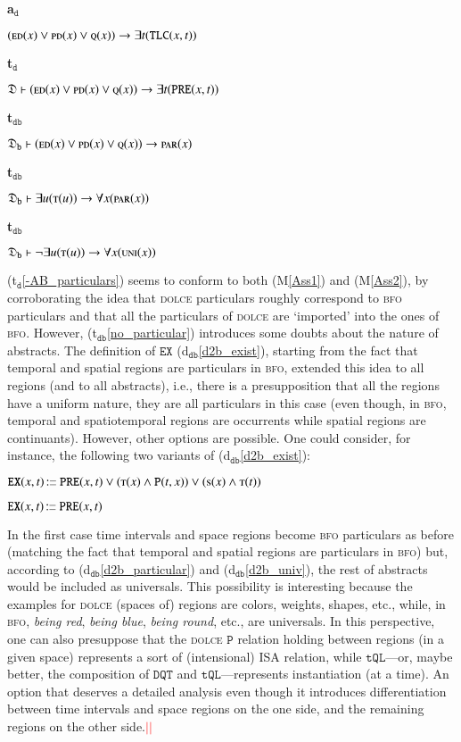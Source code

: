 \documentclass[ao]{iosart2x}
\newcommand{\nb}[1]{\textcolor{red}{$|$}\marginpar{\hspace*{-0cm}\parbox{20mm}{\scriptsize\raggedright\textcolor{red}{#1}}}}
\newcommand{\bflist}{\begin{list}{}{\setlength{\topsep}{2mm}\setlength{\parsep}{0mm}\setlength{\leftmargin}{9.2mm}\setlength{\labelwidth}{8mm}}}
\newcommand{\eflist}{\end{list}}
\newcommand{\dolceAxLabel}{\textrm{a$_\texttt{d}$}}
\newcommand{\dolceThrLabel}{\textrm{t$_\texttt{d}$}}
\newcommand{\dbDefLabel}{\textrm{d$_\texttt{db}$}}
\newcommand{\dbThrLabel}{\textrm{t$_\texttt{db}$}}
\newcounter{cntax}
\newcommand{\dolceax}[1]{\refstepcounter{cntax}\begin{small}{\bf \dolceAxLabel\thecntax\label{#1}}\end{small}}
\newcounter{cntthr}
\newcommand{\dolceth}[1]{\refstepcounter{cntthr}\begin{small}{\bf \dolceThrLabel\thecntthr\label{#1}}\end{small}}
\newcounter{cntdbth}
\newcommand{\dbth}[1]{\refstepcounter{cntdbth}\begin{small}{\bf \dbThrLabel\thecntdbth\label{#1}}\end{small}}
\newcommand{\refdolceth}[1]{({\dolceThrLabel}\ref{#1})}
\newcommand{\refdbdf}[1]{({\dbDefLabel}\ref{#1})}
\newcommand{\refdbth}[1]{({\dbThrLabel}\ref{#1})}
\newcommand{\pr}[1]{\mathtt{#1}}
\newcommand\textequal{%
 \rule[.08ex]{5pt}{0.35pt}\llap{\rule[.78ex]{5pt}{0.35pt}}}
\newcommand{\sdef}{{\hspace{1.5pt}:\hspace{-2.5pt}\textequal\hspace{3pt}}}
\newcommand{\dolce}{{\textsc{dolce}}}
\newcommand{\bfo}{{\textsc{bfo}}}
\newcommand {\thdolce} {\ensuremath{\mathfrak{D}}}
\newcommand {\thdolcedbmap} {\ensuremath{\mathfrak{D}_\texttt{b}}}
\newcommand {\EDdcat} {\textsc{ed}}
\newcommand {\PDdcat} {\textsc{pd}}
\newcommand {\Qdcat} {\textsc{q}}
\newcommand {\Sdcat} {\textsc{s}}
\newcommand {\Tdcat} {\textsc{t}}
\newcommand {\Pd} {\ensuremath{\pr{P}}}
\newcommand {\PREd} {\ensuremath{\pr{PRE}}}
\newcommand {\DQTd} {\ensuremath{\pr{DQT}}}
\newcommand {\TQLd} {\ensuremath{\pr{tQL}}}
\newcommand {\TLCd} {\ensuremath{\pr{TLC}}}
\newcommand{\bfopartic}{\textsc{par}}
\newcommand{\bfouniv}{\textsc{uni}}
\newcommand{\bfoexist}{\pr{EX}}
\begin{document}
\bflist
\item[\dolceax{d_partictime}] $(\EDdcat(x) \lor \PDdcat(x) \lor \Qdcat(x)) \to \exists t(\TLCd(x,t))$ 

\item[\dolceth{-AB_to_PRE}] $\thdolce \vdash (\EDdcat(x) \lor \PDdcat(x) \lor \Qdcat(x)) \to \exists t(\PREd(x,t))$

\item[\dbth{-AB_particulars}] $\thdolcedbmap \vdash (\EDdcat(x) \lor \PDdcat(x) \lor \Qdcat(x)) \to \bfopartic(x)$

\item[\dbth{all_particulars}] $\thdolcedbmap \vdash \exists u(\Tdcat(u)) \to \forall x(\bfopartic(x))$

\item[\dbth{no_particular}] $\thdolcedbmap \vdash \neg\exists u(\Tdcat(u)) \to \forall x(\bfouniv(x))$

\eflist

\refdolceth{-AB_particulars} seems to conform to both (M\ref{Ass1}) and (M\ref{Ass2}), by corroborating the idea that {\dolce} particulars roughly correspond to {\bfo} particulars and that all the particulars of {\dolce} are `imported' into the ones of {\bfo}. However, \refdbth{no_particular} introduces some doubts about the nature of abstracts. The definition of $\bfoexist$ \refdbdf{d2b_exist}, starting from the fact that temporal and spatial regions are particulars in {\bfo}, extended this idea to all regions (and to all abstracts), i.e., there is a presupposition that all the regions have a uniform nature, they are all particulars in this case (even though, in {\bfo}, temporal and spatiotemporal regions are occurrents while spatial regions are continuants). However, other options are possible. One could consider, for instance, the following two variants of \refdbdf{d2b_exist}:
\bflist
\item[] $\bfoexist(x,t)\sdef \PREd(x,t) \lor (\Tdcat(x) \land \Pd(t,x)) \lor (\Sdcat(x) \land \Tdcat(t))$
\item[] $\bfoexist(x,t)\sdef \PREd(x,t)$
\eflist
%
In the first case time intervals and space regions become {\bfo} particulars as before (matching the fact that temporal and spatial regions are particulars in {\bfo}) but, according to \refdbdf{d2b_particular} and \refdbdf{d2b_univ}, the rest of abstracts would be included as universals. This possibility is interesting because the examples for {\dolce} (spaces of) regions are colors, weights, shapes, etc., while, in {\bfo}, \emph{being red}, \emph{being blue}, \emph{being round}, etc., are universals. In this perspective, one can also presuppose that the {\dolce} $\Pd$ relation holding between regions (in a given space) represents a sort of (intensional) ISA relation, while $\TQLd$---or, maybe better, the composition of $\DQTd$ and  $\TQLd$---represents instantiation (at a time). An option that deserves a detailed analysis even though it introduces differentiation between time intervals and space regions on the one side, and the remaining regions on the other side.\nb{CM: estendere questo punto?}\nb{SB: a me sembra abbastanza chiaro} 
\end{document}
